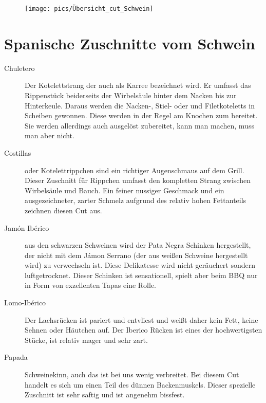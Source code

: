 \newpage
\begin{figure}[htbp]
	\centering
	\begin{minipage}{1\textwidth}
		\centering
		\texttt{[image: pics/Übersicht\_cut\_Schwein]}
		\label{fig:Übersicht1}
	\end{minipage}
\end{figure}
\newpage

\section{Spanische Zuschnitte vom Schwein}

\begin{description}

	\item [Chuletero] Der Kotelettstrang der auch als Karree bezeichnet wird. Er umfasst das Rippenstück
	beiderseits der Wirbelsäule hinter dem Nacken bis zur Hinterkeule. Daraus werden die Nacken-, Stiel- oder 
	und Filetkoteletts in Scheiben gewonnen. Diese werden in der Regel am Knochen zum bereitet. Sie werden 
    allerdings auch ausgelöst zubereitet, kann man machen, muss man aber nicht. 
	
	\item [Costillas] oder Kotelettrippchen sind ein richtiger Augenschmaus auf dem Grill. Dieser Zuschnitt für 
	Rippchen umfasst den kompletten Strang zwischen Wirbelsäule und Bauch. Ein feiner nussiger Geschmack 
	und ein ausgezeichneter, zarter Schmelz aufgrund des relativ hohen Fettanteils zeichnen diesen Cut aus.
	
	\item [Jamón Ibérico] aus den schwarzen Schweinen wird der Pata Negra Schinken hergestellt, der nicht mit 
	dem Jámon Serrano (der aus weißen Schweine hergestellt wird) zu verwechseln ist. Diese Delikatesse wird 
	nicht geräuchert sondern luftgetrocknet. Dieser Schinken ist sensationell, spielt aber beim BBQ nur in Form 
	von exzellenten Tapas eine Rolle. 
	
	\item [Lomo-Ibérico] Der Lachsrücken ist pariert und entvliest und weißt daher kein Fett, keine Sehnen oder 
	Häutchen auf. Der Iberico Rücken ist eines der hochwertigsten Stücke, ist relativ mager und sehr zart.
	
	\item [Papada] Schweinekinn, auch das ist bei uns wenig verbreitet. Bei diesem Cut handelt es sich 
	um einen Teil des dünnen Backenmuskels. Dieser spezielle Zuschnitt ist sehr saftig und ist angenehm bissfest.
	

\end{description}
